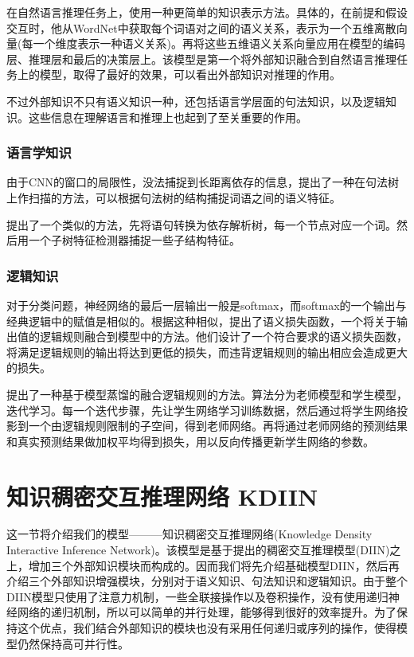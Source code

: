 \documentclass[UTF8,11pt,a4paper,nofonts]{ctexart}
\begin{document}
在自然语言推理任务上，\cite{Chen2017NaturalLI}使用一种更简单的知识表示方法。具体的，在前提和假设交互时，他从WordNet中获取每个词语对之间的语义关系，表示为一个五维离散向量(每一个维度表示一种语义关系)。再将这些五维语义关系向量应用在模型的编码层、推理层和最后的决策层上。该模型是第一个将外部知识融合到自然语言推理任务上的模型，取得了最好的效果，可以看出外部知识对推理的作用。

不过外部知识不只有语义知识一种，还包括语言学层面的句法知识，以及逻辑知识。这些信息在理解语言和推理上也起到了至关重要的作用。

\subsubsection{语言学知识}

由于CNN的窗口的局限性，没法捕捉到长距离依存的信息，\cite{Ma2015DependencybasedCN}提出了一种在句法树上作扫描的方法，可以根据句法树的结构捕捉词语之间的语义特征。

\cite{Mou2016NaturalLI}提出了一个类似的方法，先将语句转换为依存解析树，每一个节点对应一个词。然后用一个子树特征检测器捕捉一些子结构特征。

\subsubsection{逻辑知识}

对于分类问题，神经网络的最后一层输出一般是softmax，而softmax的一个输出与经典逻辑中的赋值是相似的。根据这种相似，\cite{Xu2017ASL}提出了语义损失函数，一个将关于输出值的逻辑规则融合到模型中的方法。他们设计了一个符合要求的语义损失函数，将满足逻辑规则的输出将达到更低的损失，而违背逻辑规则的输出相应会造成更大的损失。

\cite{Hu2016HarnessingDN, Hu2016DeepNN}提出了一种基于模型蒸馏的融合逻辑规则的方法。算法分为老师模型和学生模型，迭代学习。每一个迭代步骤，先让学生网络学习训练数据，然后通过将学生网络投影到一个由逻辑规则限制的子空间，得到老师网络。再将通过老师网络的预测结果和真实预测结果做加权平均得到损失，用以反向传播更新学生网络的参数。






\newpage
\section{知识稠密交互推理网络 KDIIN}

这一节将介绍我们的模型———知识稠密交互推理网络(Knowledge Density Interactive Inference Network)。该模型是基于\cite{yichen2018nli}提出的稠密交互推理模型(DIIN)之上，增加三个外部知识模块而构成的。因而我们将先介绍基础模型DIIN，然后再介绍三个外部知识增强模块，分别对于语义知识、句法知识和逻辑知识。由于整个DIIN模型只使用了注意力机制，一些全联接操作以及卷积操作，没有使用递归神经网络的递归机制，所以可以简单的并行处理，能够得到很好的效率提升。为了保持这个优点，我们结合外部知识的模块也没有采用任何递归或序列的操作，使得模型仍然保持高可并行性。
\end{document}
